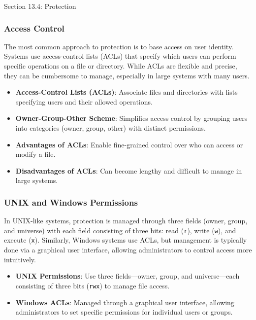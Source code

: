 \begin{notes}{Section 13.4: Protection}
    \subsubsection*{Access Control}
    
    The most common approach to protection is to base access on user identity. Systems use access-control lists (ACLs) that specify which users can perform specific operations on a file or directory. 
    While ACLs are flexible and precise, they can be cumbersome to manage, especially in large systems with many users.
    
    \begin{highlight}
    
        \begin{itemize}
            \item \textbf{Access-Control Lists (ACLs)}: Associate files and directories with lists specifying users and their allowed operations.
            \item \textbf{Owner-Group-Other Scheme}: Simplifies access control by grouping users into categories (owner, group, other) with distinct permissions.
            \item \textbf{Advantages of ACLs}: Enable fine-grained control over who can access or modify a file.
            \item \textbf{Disadvantages of ACLs}: Can become lengthy and difficult to manage in large systems.
        \end{itemize}
    
    \end{highlight}
    
    \subsubsection*{UNIX and Windows Permissions}
    
    In UNIX-like systems, protection is managed through three fields (owner, group, and universe) with each field consisting of three bits: read (\texttt{r}), write (\texttt{w}), and execute (\texttt{x}). 
    Similarly, Windows systems use ACLs, but management is typically done via a graphical user interface, allowing administrators to control access more intuitively.
    
    \begin{highlight}
    
        \begin{itemize}
            \item \textbf{UNIX Permissions}: Use three fields—owner, group, and universe—each consisting of three bits (\texttt{rwx}) to manage file access.
            \item \textbf{Windows ACLs}: Managed through a graphical user interface, allowing administrators to set specific permissions for individual users or groups.
        \end{itemize}
    

\end{highlight}
\end{notes}
